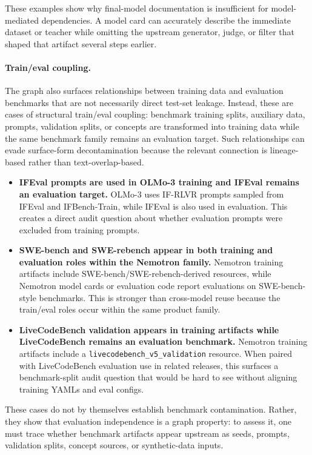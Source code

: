 These examples show why final-model documentation is insufficient for model-mediated dependencies. A model card can accurately describe the immediate dataset or teacher while omitting the upstream generator, judge, or filter that shaped that artifact several steps earlier.

\paragraph{Train/eval coupling.}

The graph also surfaces relationships between training data and evaluation benchmarks that are not necessarily direct test-set leakage. Instead, these are cases of structural train/eval coupling: benchmark training splits, auxiliary data, prompts, validation splits, or concepts are transformed into training data while the same benchmark family remains an evaluation target. Such relationships can evade surface-form decontamination because the relevant connection is lineage-based rather than text-overlap-based.

\begin{itemize}
    \item \textbf{IFEval prompts are used in OLMo-3 training and IFEval remains an evaluation target.}
    OLMo-3 uses IF-RLVR prompts sampled from IFEval and IFBench-Train, while IFEval is also used in evaluation. This creates a direct audit question about whether evaluation prompts were excluded from training prompts.

    \item \textbf{SWE-bench and SWE-rebench appear in both training and evaluation roles within the Nemotron family.}
    Nemotron training artifacts include SWE-bench/SWE-rebench-derived resources, while Nemotron model cards or evaluation code report evaluations on SWE-bench-style benchmarks. This is stronger than cross-model reuse because the train/eval roles occur within the same product family.

    \item \textbf{LiveCodeBench validation appears in training artifacts while LiveCodeBench remains an evaluation benchmark.}
    Nemotron training artifacts include a \texttt{livecodebench\_v5\_validation} resource. When paired with LiveCodeBench evaluation use in related releases, this surfaces a benchmark-split audit question that would be hard to see without aligning training YAMLs and eval configs.
\end{itemize}

These cases do not by themselves establish benchmark contamination. Rather, they show that evaluation independence is a graph property: to assess it, one must trace whether benchmark artifacts appear upstream as seeds, prompts, validation splits, concept sources, or synthetic-data inputs.

